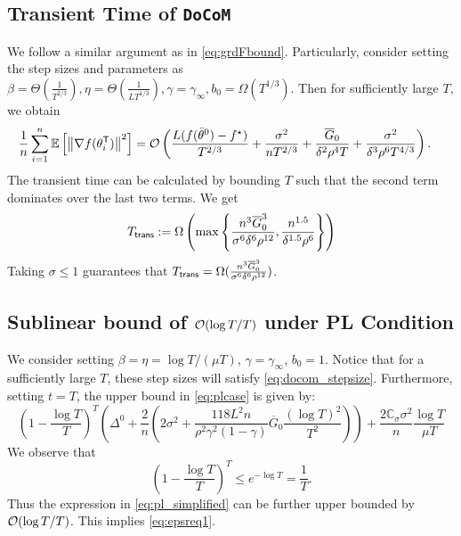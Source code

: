 \documentclass[10pt]{article} %
\theoremstyle{plain}
\theoremstyle{definition}
\theoremstyle{remark}
\newcommand{\aname}{{\tt DoCoM}}
\newcommand{\prm}{\theta}
\newcommand{\avgtheta}{\bar{\prm}}
\newcommand{\norm}[1]{\left\| #1 \right\|}
\newcommand{\ConstS}{\mathbb{C}_\sigma}
\newcommand{\InitG}{\overline{G}_0}
\newcommand{\redtmp}{}
\begin{document}
\subsection{Transient Time of \aname} \label{app:step_twist}
We follow a similar argument as in \eqref{eq:grdFbound}. Particularly, consider setting the step sizes and parameters as $\beta = \Theta( \frac{ 1 }{ T^{2/3} } ), \eta = \Theta( \frac{ 1 }{ L T^{1/3} } ), \gamma = \gamma_\infty, b_0 = \Omega(  T^{1/3} )$. Then for sufficiently large $T$, we obtain
\begin{align}
& \frac{1}{n} \sum_{i=1}^n \mathbb{E} \left[ \norm{ \nabla f( \theta_i^{\sf T} )}^2 \right] = {\cal O} \left( \frac{L (f(\avgtheta^0) - f^\star)}{T^{2/3}} + \frac{\sigma^2}{ n T^{2/3}} + \frac{ \InitG}{ \delta^2 \rho^4 T} + \frac{\sigma^2}{ \delta^3 \rho^6 T^{4/3}} \right).
\end{align}
The transient time can be calculated by bounding $T$ such that the second term dominates over the last two terms. We get 
\begin{align}
T_{\sf trans} := \Omega \left( \max \left\{ \frac{n^3 \InitG^3}{ \sigma^6 \delta^6 \rho^{12} }, \frac{n^{1.5}}{\delta^{1.5} \rho^6} \right\} \right)  
\end{align}
Taking $\sigma \leq 1$ guarantees that $T_{\sf trans} = \Omega ( \frac{n^3 \InitG^3}{ \sigma^6 \delta^6 \rho^{12} } )$.

\subsection{Sublinear bound of ${\cal O}(\log T /T)$ under PL Condition} \label{app:largeT} 
We consider setting $\beta = \eta = \log T /(\mu T)$, $\gamma = \gamma_\infty$, $b_0 = 1$. Notice that for a sufficiently large $T$, these step sizes will satisfy \eqref{eq:docom_stepsize}. Furthermore, setting $t = T$, the upper bound in \eqref{eq:plcase} is given by:
\begin{equation} \label{eq:pl_simplified}
\left( 1 - \frac{  \log T }{ T} \right)^T \left( \Delta^0 + \frac{2}{ n } \left( 2\sigma^2 + \frac{{\redtmp 118}L^2n}{\rho^2 \gamma^2(1-\gamma)} \InitG \frac{(\log T)^2}{T^2} \right) \right)  + \frac{2 \ConstS \sigma^2}{n} \frac{\log T }{\mu T}
\end{equation}
We observe that 
\[ 
\left( 1 - \frac{\log T}{T} \right)^T \leq e^{- \log T} = \frac{1}{T}.
\]
Thus the expression in \eqref{eq:pl_simplified} can be further upper bounded by ${\cal O}(\log T/T)$. This implies \eqref{eq:epsreq1}.
\end{document}
